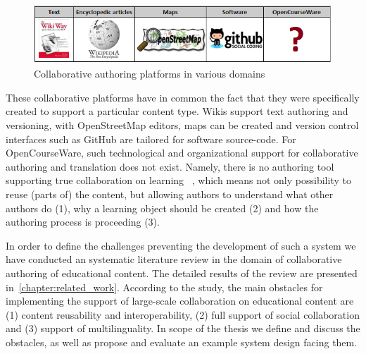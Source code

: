 \documentclass[ngerman,UKenglish,table]{scrbook}
\begin{document}
\begin{figure}
\centering
\includegraphics[scale=1]{images/empty_spot.png}
\caption{Collaborative authoring platforms in various domains}
\label{fig:slidewiki_place}
\end{figure}

These collaborative platforms have in common the fact that they were specifically created to support a particular content type.
Wikis support text authoring and versioning, with OpenStreetMap editors, maps can be created and version control interfaces such as GitHub are tailored for software source-code.
For OpenCourseWare, such technological and organizational support for collaborative authoring and translation does not exist.
Namely, there is no authoring tool supporting true collaboration on learning ~\cite{Nurjanah2011}, which means not only possibility to reuse (parts of) the content, but allowing authors to understand what other authors do (1), why a learning object should be created (2) and how the authoring process is proceeding (3). 

In order to define the challenges preventing the development of such a system we have conducted an systematic literature review in the domain of collaborative authoring of educational content.
The detailed results of the review are presented in~\autoref{chapter:related_work}.
According to the study, the main obstacles for implementing the support of large-scale collaboration on educational content are (1) content reusability and interoperability, (2) full support of social collaboration and (3) support of multilinguality.
In scope of the thesis we define and discuss the obstacles, as well as propose and evaluate an example system design facing them.
\end{document}
